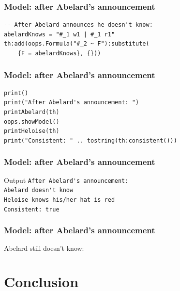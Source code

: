\documentclass{beamer}
\begin{document}
\begin{frame}[fragile]
\frametitle{Model: after Abelard's announcement}
\begin{lstlisting}
-- After Abelard announces he doesn't know:
abelardKnows = "#_1 w1 | #_1 r1"
th:add(oops.Formula("#_2 ~ F"):substitute(
    {F = abelardKnows}, {}))
\end{lstlisting}
\end{frame}

\begin{frame}[fragile]
\frametitle{Model: after Abelard's announcement}
\begin{lstlisting}
print()
print("After Abelard's announcement: ")
printAbelard(th)
oops.showModel()
printHeloise(th)
print("Consistent: " .. tostring(th:consistent()))
\end{lstlisting}
\end{frame}

\begin{frame}[fragile]
\frametitle{Model: after Abelard's announcement}
\begin{block}{Output}
\verb!After Abelard's announcement:! \\
\verb!Abelard doesn't know! \\
\verb!Heloise knows his/her hat is red! \\
\verb!Consistent: true!
\end{block}
\end{frame}

\begin{frame}
\frametitle{Model: after Abelard's announcement}
Abelard still doesn't know:

\end{frame}

\section{Conclusion}
\end{document}
